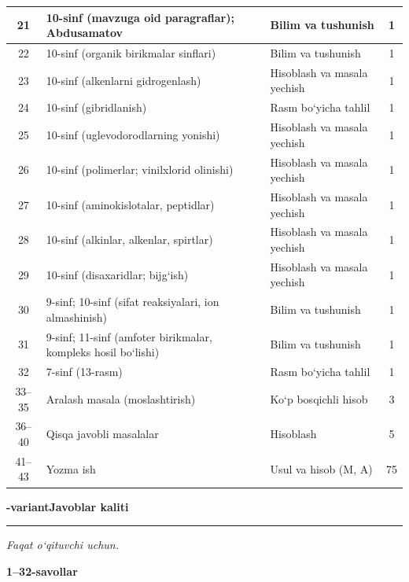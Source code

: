 \documentclass[11pt,a4paper]{article}
\newcommand{\hdrpill}[1]{\begin{tikzpicture}[baseline=0pt]\node[fill=ygreen,text=white,rounded corners=8pt,inner xsep=10pt,inner ysep=5pt,font=\fontsize{13}{15}\bfseries\selectfont] at (0,0.475){#1};\end{tikzpicture}}
\newcommand{\curvar}{}\fancyhead[R]{\hdrpill{\curvar}}
\begin{document}
{\begin{longtable}{|c|p{7.2cm}|p{5.4cm}|c|}
21 & 10-sinf (mavzuga oid paragraflar); Abdusamatov & Bilim va tushunish & 1\\\hline
22 & 10-sinf (organik birikmalar sinflari) & Bilim va tushunish & 1\\\hline
23 & 10-sinf (alkenlarni gidrogenlash) & Hisoblash va masala yechish & 1\\\hline
24 & 10-sinf (gibridlanish) & Rasm bo`yicha tahlil & 1\\\hline
25 & 10-sinf (uglevodorodlarning yonishi) & Hisoblash va masala yechish & 1\\\hline
26 & 10-sinf (polimerlar; vinilxlorid olinishi) & Hisoblash va masala yechish & 1\\\hline
27 & 10-sinf (aminokislotalar, peptidlar) & Hisoblash va masala yechish & 1\\\hline
28 & 10-sinf (alkinlar, alkenlar, spirtlar) & Hisoblash va masala yechish & 1\\\hline
29 & 10-sinf (disaxaridlar; bijg`ish) & Hisoblash va masala yechish & 1\\\hline
30 & 9-sinf; 10-sinf (sifat reaksiyalari, ion almashinish) & Bilim va tushunish & 1\\\hline
31 & 9-sinf; 11-sinf (amfoter birikmalar, kompleks hosil bo`lishi) & Bilim va tushunish & 1\\\hline
32 & 7-sinf (13-rasm) & Rasm bo`yicha tahlil & 1\\\hline
33--35 & Aralash masala (moslashtirish) & Ko`p bosqichli hisob & 3\\\hline
36--40 & Qisqa javobli masalalar & Hisoblash & 5\\\hline
41--43 & Yozma ish & Usul va hisob (M, A) & 75\\\hline
\end{longtable}}
\renewcommand{\curvar}{Javoblar}
\newpage
\noindent\textbf{\fontsize{13}{15}-variant}\hfill \textbf{Javoblar kaliti}\par\smallskip\hrule\smallskip
\textit{Faqat o`qituvchi uchun.}\par\medskip
\noindent\textbf{1--32-savollar}\par\smallskip
\end{document}
